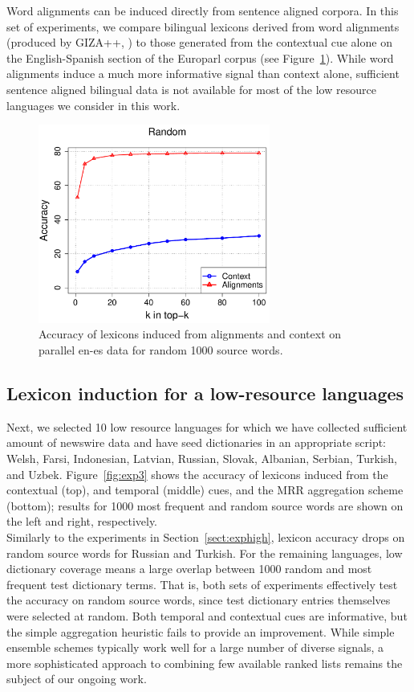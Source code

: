 \documentclass{article}
\newcommand{\mnote}[1]{\marginpar{%
  \vskip-\baselineskip
  \raggedright\footnotesize
  \itshape\hrule\smallskip\tiny{#1}\par\smallskip\hrule}}
\newcommand{\mtodo}[1]{\mnote{\textcolor{red}{#1}}}
\newcommand{\secref}[1]{Section~\ref{#1}}
\newcommand{\figref}[1]{Figure~\ref{#1}}
\begin{document}
Word alignments can be induced directly from sentence aligned corpora.  In this set of experiments, we compare bilingual lexicons derived from word alignments (produced by GIZA++, \cite{Och:2003}) to those generated from the contextual cue alone on the English-Spanish section of the Europarl corpus (see \figref{fig:exp2}). While word alignments induce a much more informative signal than context alone, sufficient sentence aligned bilingual data is not available for most of the low resource languages we consider in this work.\\

\begin{figure}[h!]
\centerline{\mbox{\includegraphics[width=3in]{figures/exp2/alignvscontext}}}
\caption{Accuracy of lexicons induced from alignments and context on parallel en-es data for random 1000 source words.}
\label{fig:exp2}
\end{figure}

\subsection{Lexicon induction for a low-resource languages}

Next, we selected 10 low resource languages for which we have collected sufficient amount of newswire data and have seed dictionaries in an appropriate script: Welsh, Farsi, Indonesian, Latvian, Russian, Slovak, Albanian, Serbian, Turkish, and Uzbek.  \figref{fig:exp3} shows the accuracy of lexicons induced from the contextual (top), and temporal (middle) cues, and the MRR aggregation scheme (bottom); results for 1000 most frequent and random source words are shown on the left and right, respectively.\\

Similarly to the experiments in \secref{sect:exphigh}, lexicon accuracy drops on random source words for Russian and Turkish.  For the remaining languages, low dictionary coverage means a large overlap between 1000 random and most frequent test dictionary terms.  That is, both sets of experiments effectively test the accuracy on random source words, since test dictionary entries themselves were selected at random. \mtodo{Confusing? Drop most frequent?}  Both temporal and contextual cues are informative, but the simple aggregation heuristic fails to provide an improvement.  While simple ensemble schemes typically work well for a large number of diverse signals, a more sophisticated approach to combining few available ranked lists remains the subject of our ongoing work.\\
\end{document}
